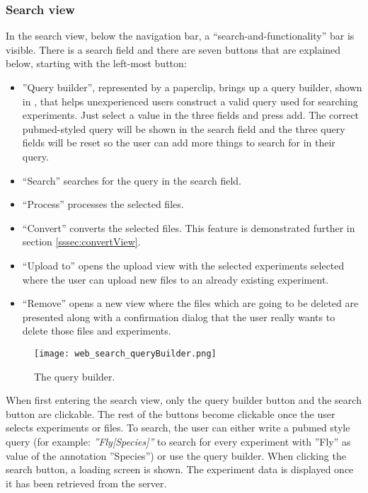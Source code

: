 \subsubsection{Search view}

In the search view, below the navigation bar, a “search-and-functionality” bar is visible. There is a search field and there are seven buttons that are explained below, starting with the left-most button: 

\begin{itemize}
	\item ”Query builder”, represented by a paperclip, brings up a query builder, shown in , that helps unexperienced users construct a valid query used for searching experiments. Just select a value in the three fields and press add. The correct pubmed-styled query will be shown in the search field and the three query fields will be reset so the user can add more things to search for in their query.
	\item “Search” searches for the query in the search field. 
	\item “Process” processes the selected files.
    \item “Convert” converts the selected files. This feature is demonstrated further in section \ref{sssec:convertView}.
    \item “Upload to” opens the upload view with the selected experiments selected where the user can upload new files to an already existing experiment.
    \item “Remove” opens a new view where the files which are going to be deleted are presented along with a confirmation dialog that the user really wants to delete those files and experiments.
\end{itemize}

\begin{figure}[h]
\centering
\texttt{[image: web\_search\_queryBuilder.png]}
\caption{\label{fig:web_search_queryBuilder}The query builder.}
\end{figure}

When first entering the search view, only the query builder button and the search button are clickable. The rest of the buttons become clickable once the user selects experiments or files. To search, the user can either write a pubmed style query (for example: \textit{”Fly[Species]”} to search for every experiment with ”Fly” as value of the annotation ”Species”) or use the query builder. When clicking the search button, a loading screen is shown. The experiment data is displayed once it has been retrieved from the server.

